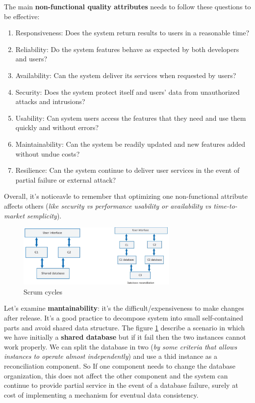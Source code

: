 \documentclass[10pt,a4paper]{report}
\begin{document}
The main \textbf{non-functional quality attributes} needs to follow these questions to be effective:
\begin{enumerate}
	\item Responsiveness: Does the system return results to users in a reasonable time?
	\item Reliability: Do the system features behave as expected by both developers and users?
	\item Availability:	Can the system deliver its services when requested by users?
	\item Security: Does the system protect itself and users’ data from unauthorized attacks and
	intrusions?
	\item Usability: Can system users access the features that they need and use them quickly and
	without errors?
	\item Maintainability: Can the system be readily updated and new features added without undue costs?
	\item Resilience: Can the system continue to deliver user services in the event of partial failure or
	external attack?
\end{enumerate}
Overall, it's noticeavle to remember that optimizing one non-functional attribute affects others (\textit{like security vs performance usability or availability vs time-to-market semplicity}).
 \begin{figure}[h]
	\centering
	\includegraphics[width=0.7\textwidth]{image25}
	\caption{Scrum cycles}
	\label{image25}
\end{figure}
Let's examine \textbf{mantainability}: it's the difficult/expensiveness to make changes after release. It's a good practice to decompose system into small self-contained parts and avoid shared data structure.
The figure \ref{image25} describe a scenario in which we have initially a \textbf{shared database} but if it fail then the two instances cannot work properly. We can split the database in two (\textit{by some criteria that allows instances to operate almost independently}) and use a thid instance as a reconciliation component. So If one component needs to change the database organization, this does not affect the other component and the system can continue to provide partial service in the event of a database failure, surely at cost of implementing a mechanism for eventual data consistency.
\end{document}
